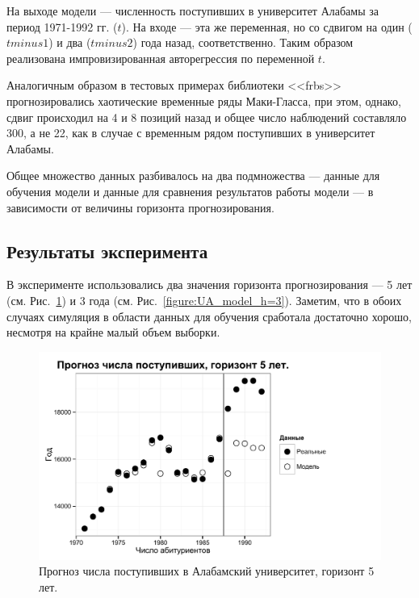 \documentclass[a4paper,14pt]{article}
\begin{document}
На выходе модели --- численность поступивших в университет Алабамы за период 1971-1992 гг. ($t$). На входе --- эта же переменная, но со сдвигом на один ($tminus1$) и два ($tminus2$) года назад, соответственно. Таким образом реализована импровизированная авторегрессия по переменной $t$. 

Аналогичным образом в тестовых примерах библиотеки <<frbs>> прогнозировались хаотические временные ряды Маки-Гласса, при этом, однако, сдвиг происходил на 4 и 8 позиций назад и общее число наблюдений составляло 300, а не 22, как в случае с временным рядом поступивших в университет Алабамы.

Общее множество данных разбивалось на два подмножества --- данные для обучения модели и данные для сравнения результатов работы модели --- в зависимости от величины горизонта прогнозирования. 

\subsection{Результаты эксперимента}

В эксперименте использовались два значения горизонта прогнозирования --- 5 лет (см. Рис.~\ref{figure:UA_model_h=5}) и 3 года (см. Рис.~\ref{figure:UA_model_h=3}). Заметим, что в обоих случаях симуляция в области данных для обучения сработала достаточно хорошо, несмотря на крайне малый объем выборки. 

\begin{figure}[bhtp]
	\begin{center}
		\includegraphics{images/UA_model_h=5.pdf}
		\caption{Прогноз числа поступивших в Алабамский университет, \newline горизонт 5 лет.}		
		\label{figure:UA_model_h=5}
	\end{center}
\end{figure}
\end{document}
